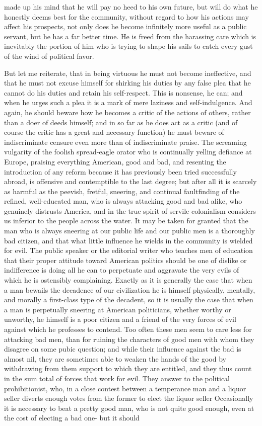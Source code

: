 \documentclass[a4paper]{amsbook}
\begin{document}
made up his mind that he will pay no heed to his own future, but will do what he honestly deems best for the community, without regard to how his actions may affect his prospects, not only does he become infinitely more useful as a public servant, but he has a far better time. He is freed from the harassing care which is inevitably the portion of him who is trying to shape his sails to catch every gust of the wind of political favor.

But let me reiterate, that in being virtuous he must not become ineffective, and that he must not excuse himself for shirking his duties by any false plea that he cannot do his duties and retain his self-respect. This is nonsense, he can; and when he urges such a plea it is a mark of mere laziness and self-indulgence. And again, he should beware how he becomes a critic of the actions of others, rather than a doer of deeds himself; and in so far as he does act as a critic (and of course the critic has a great and necessary function) he must beware of indiscriminate censure even more than of indiscriminate praise. The screaming vulgarity of the foolish spread-eagle orator who is continually yelling defiance at Europe, praising everything American, good and bad, and resenting the introduction of any reform because it has previously been tried successfully abroad, is offensive and contemptible to the last degree; but after all it is scarcely as harmful as the peevish, fretful, sneering, and continual faultfinding of the refined, well-educated man, who is always attacking good and bad alike, who genuinely distrusts America, and in the true spirit of servile colonialism considers us inferior to the people across the water. It may be taken for granted that the man who is always sneering at our public life and our public men is a thoroughly bad citizen, and that what little influence he wields in the community is wielded for evil. The public speaker or the editorial writer who teaches men of education that their proper attitude toward American politics should be one of dislike or indifference is doing all he can to perpetuate and aggravate the very evils of which he is ostensibly complaining. Exactly as it is generally the case that when a man bewails the decadence of our civilization he is himself physically, mentally, and morally a first-class type of the decadent, so it is usually the case that when a man is perpetually sneering at American politicians, whether worthy or unworthy, he himself is a poor citizen and a friend of the very forces of evil against which he professes to contend. Too often these men seem to care less for attacking bad men, than for ruining the characters of good men with whom they disagree on some pubic question; and while their influence against the bad is almost nil, they are sometimes able to weaken the hands of the good by withdrawing from them support to which they are entitled, and they thus count in the sum total of forces that work for evil. They answer to the political prohibitionist, who, in a close contest between a temperance man and a liquor seller diverts enough votes from the former to elect the liquor seller Occasionally it is necessary to beat a pretty good man, who is not quite good enough, even at the cost of electing a bad one- but it should 
\end{document}
